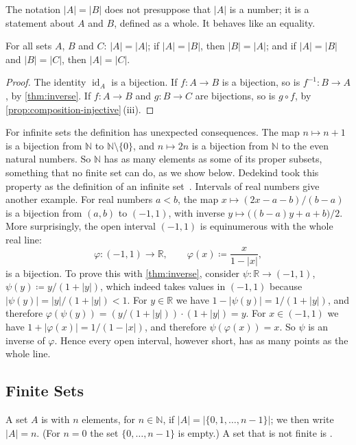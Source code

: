 The notation $|A|=|B|$ does not presuppose that $|A|$ is a number; it is a statement about $A$ and $B$, defined as a whole. It behaves like an equality.

\begin{proposition}
\label{prop:equinumerous}
For all sets $A$, $B$ and $C$: $|A|=|A|$; if $|A|=|B|$, then $|B|=|A|$; and if $|A|=|B|$ and $|B|=|C|$, then $|A|=|C|$.
\end{proposition}

\begin{proof}
The identity $\operatorname{id}_A$ is a bijection. If $f\colon A\to B$ is a bijection, so is $f^{-1}\colon B\to A$, by \cref{thm:inverse}. If $f\colon A\to B$ and $g\colon B\to C$ are bijections, so is $g\circ f$, by \cref{prop:composition-injective}\,(iii).
\end{proof}

For infinite sets the definition has unexpected consequences. The map $n\mapsto n+1$ is a bijection from $\mathbb N$ to $\mathbb N\setminus\{0\}$, and $n\mapsto2n$ is a bijection from $\mathbb N$ to the even natural numbers. So $\mathbb N$ has as many elements as some of its proper subsets, something that no finite set can do, as we show below. Dedekind took this property as the definition of an infinite set~\cite{dedekind1888}. Intervals of real numbers give another example. For real numbers $a<b$, the map $x\mapsto(2x-a-b)/(b-a)$ is a bijection from $(a,b)$ to $(-1,1)$, with inverse $y\mapsto\bigl((b-a)y+a+b\bigr)/2$. More surprisingly, the open interval $(-1,1)$ is equinumerous with the whole real line:
\[
\varphi\colon(-1,1)\to\mathbb R,\qquad\varphi(x)\coloneqq\frac{x}{1-|x|},
\]
is a bijection. To prove this with \cref{thm:inverse}, consider $\psi\colon\mathbb R\to(-1,1)$, $\psi(y)\coloneqq y/(1+|y|)$, which indeed takes values in $(-1,1)$ because $|\psi(y)|=|y|/(1+|y|)<1$. For $y\in\mathbb R$ we have $1-|\psi(y)|=1/(1+|y|)$, and therefore $\varphi(\psi(y))=(y/(1+|y|))\cdot(1+|y|)=y$. For $x\in(-1,1)$ we have $1+|\varphi(x)|=1/(1-|x|)$, and therefore $\psi(\varphi(x))=x$. So $\psi$ is an inverse of $\varphi$. Hence every open interval, however short, has as many points as the whole line.

\subsection{Finite Sets}

\begin{definition}
\label{def:finite}
A set $A$ is  with $n$ elements, for $n\in\mathbb N$, if $|A|=|\{0,1,\ldots,n-1\}|$; we then write $|A|=n$. (For $n=0$ the set $\{0,\ldots,n-1\}$ is empty.) A set that is not finite is .
\end{definition}

